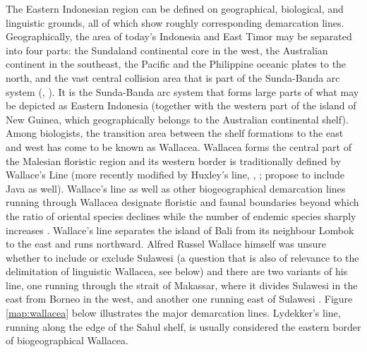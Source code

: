 The Eastern Indonesian region can be defined on geographical, biological, and linguistic grounds, all of which show roughly corresponding demarcation lines. Geographically, the area of today's Indonesia and East Timor may be separated into four parts: the Sundaland continental core in the west, the Australian continent in the southeast, the Pacific and the Philippine oceanic plates to the north, and the vast central collision area that is part of the Sunda-Banda arc system (\citealt{Bellwood2007}, \citealt{Hall2009}). It is the Sunda-Banda arc system that forms large parts of what may be depicted as Eastern Indonesia (together with the western part of the island of New Guinea, which geographically belongs to the Australian continental shelf). Among biologists, the transition area between the shelf formations to the east and west has come to be known as Wallacea. Wallacea forms the central part of the Malesian floristic region and its western border is traditionally defined by Wallace's Line (more recently modified by Huxley's line, \citealt{Bellwood2007}, \citealt{Raes2009}; \citealt{Welzen2011} propose to include Java as well). Wallace's line as well as other biogeographical demarcation lines running through Wallacea designate floristic and faunal boundaries beyond which the ratio of oriental species declines while the number of endemic species sharply increases \citep{Bellwood2007}. Wallace's line separates the island of Bali from its neighbour Lombok to the east and runs northward. Alfred Russel Wallace himself was unsure whether to include or exclude Sulawesi (a question that is also of relevance to the delimitation of linguistic Wallacea, see below) and there are two variants of his line, one running through the strait of Makassar, where it divides Sulawesi in the east from Borneo in the west, and another one running east of Sulawesi \citep{Welzen2011}. Figure \ref{map:wallacea} below illustrates the major demarcation lines. Lydekker's line, running along the edge of the Sahul shelf, is usually considered the eastern border of biogeographical Wallacea.

